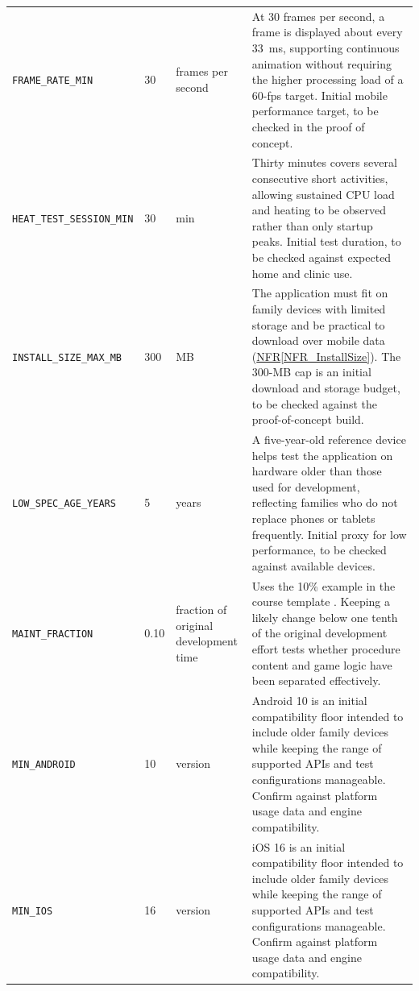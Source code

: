 \documentclass[10pt]{article}
\newcommand{\nfrref}[1]{\hyperref[#1]{NFR\ref*{#1}}}
\begin{document}
\begin{longtable}{>{\raggedright\arraybackslash}p{} p{} >{\raggedright\arraybackslash}p{} >{\raggedright\arraybackslash}p{}}
\texttt{FRAME\_RATE\_MIN}
\label{const:FRAME_RATE_MIN}
& 30 & frames per second & At 30 frames per second, a frame is displayed about every 33~ms, supporting continuous animation without requiring the higher processing load of a 60-fps target. Initial mobile performance target, to be checked in the proof of concept. \\

\texttt{HEAT\_TEST\_SESSION\_MIN}
\label{const:HEAT_TEST_SESSION_MIN}
& 30 & min & Thirty minutes covers several consecutive short activities, allowing sustained CPU load and heating to be observed rather than only startup peaks. Initial test duration, to be checked against expected home and clinic use. \\

\texttt{INSTALL\_SIZE\_MAX\_MB}
\label{const:INSTALL_SIZE_MAX_MB}
& 300 & MB & The application must fit on family devices with limited storage and be practical to download over mobile data (\nfrref{NFR_InstallSize}). The 300-MB cap is an initial download and storage budget, to be checked against the proof-of-concept build. \\

\texttt{LOW\_SPEC\_AGE\_YEARS}
\label{const:LOW_SPEC_AGE_YEARS}
& 5 & years & A five-year-old reference device helps test the application on hardware older than those used for development, reflecting families who do not replace phones or tablets frequently. Initial proxy for low performance, to be checked against available devices. \\

\texttt{MAINT\_FRACTION}
\label{const:MAINT_FRACTION}
& 0.10 & fraction of original development time & Uses the 10\% example in the course template \cite{SmithCapTemplate}. Keeping a likely change below one tenth of the original development effort tests whether procedure content and game logic have been separated effectively. \\

\texttt{MIN\_ANDROID}
\label{const:MIN_ANDROID}
& 10 & version & Android 10 is an initial compatibility floor intended to include older family devices while keeping the range of supported APIs and test configurations manageable. Confirm against platform usage data and engine compatibility. \\

\texttt{MIN\_IOS}
\label{const:MIN_IOS}
& 16 & version & iOS 16 is an initial compatibility floor intended to include older family devices while keeping the range of supported APIs and test configurations manageable. Confirm against platform usage data and engine compatibility. \\


\end{longtable}
\end{document}
